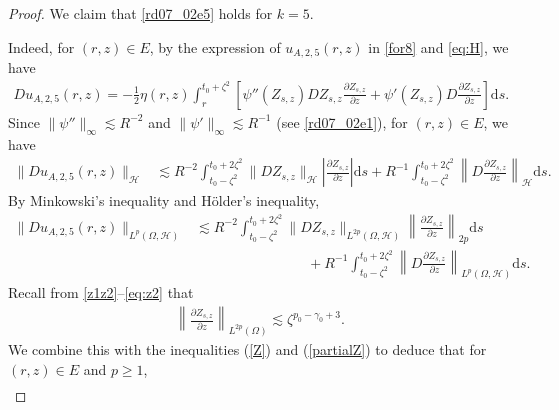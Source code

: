 \documentclass[12pt,a4paper]{article}
\newcommand{\R}{{\mathbb{R}}}
\newcommand{\E}{\mathrm{E}}
\renewcommand{\d}{\mathrm{d}}
\newcommand {\deltah}{{\zeta}}
\newcommand{\<}{\langle}
\renewcommand{\>}{\rangle}
\begin{document}
\begin{proof}
           We claim that \eqref{rd07_02e5} holds for $k=5$. 

Indeed, for $(r,z)\in E$, 
          by the expression of $u_{A,2,5}(r,z)$ in \eqref{for8} and \eqref{eq:H}, we have
          \begin{align*}
          Du_{A,2,5}(r,z) =-\frac12 \eta(r,z)\int_r^{t_0+\deltah^2}\left[\psi''(Z_{s, z})DZ_{s,z} \frac{\partial Z_{s,z}}{\partial z}
          + \psi'(Z_{s, z}) D\frac{\partial Z_{s,z}}{\partial z}\right]
          \d s.
          \end{align*}
Since $\|\psi''\|_{\infty} \lesssim R^{-2}$ and $\|\psi'\|_{\infty} \lesssim R^{-1}$ (see \eqref{rd07_02e1}), for $(r,z)\in E$, we have
 \begin{align*}
          \|Du_{A,2,5}(r,z)\|_{\mathcal{H}} &\lesssim R^{-2}\int_{t_0-\deltah^2}^{t_0+2\deltah^2} \|DZ_{s,z}\|_{\mathcal{H}}
          \left| \frac{\partial Z_{s,z}}{\partial z}\right| \d s 
          + R^{-1}\int_{t_0-\deltah^2}^{t_0+2\deltah^2}
                     \left\|D\frac{\partial Z_{s,z}}{\partial z}\right\|_{\mathcal{H}}\d s. 
\end{align*}
          By Minkowski's inequality and H\"older's inequality, 
          \begin{align*}
          \|Du_{A,2,5}(r,z)\|_{L^{p}(\Omega,\mathcal{H})} &\lesssim R^{-2}\int_{t_0-\deltah^2}^{t_0+2\deltah^2} \|DZ_{s,z}\|_{L^{2p}(\Omega,\mathcal{H})}
          \left\| \frac{\partial Z_{s,z}}{\partial z}\right\|_{2p} \d s\\
          &\qquad\qquad\qquad\qquad+ R^{-1}\int_{t_0-\deltah^2}^{t_0+2\deltah^2}
                     \left\|D\frac{\partial Z_{s,z}}{\partial z}\right\|_{L^p(\Omega, \mathcal{H})}\d s. 
          \end{align*}
          Recall from \eqref{z1z2}--\eqref{eq:z2} that
          \begin{align}\label{mom:partialZ}
                    \left\| \frac{\partial Z_{s,z}}{\partial z}\right\|_{L^{2p}(\Omega)}  \lesssim \deltah^{p_0-\gamma_0+3}.
          \end{align}
          We combine this with the inequalities  (\ref{Z}) and  (\ref{partialZ}) to deduce that 
          for $(r,z)\in E$ and $p\geq1$,
\begin{align*}

\end{align*}
\end{proof}
\end{document}
